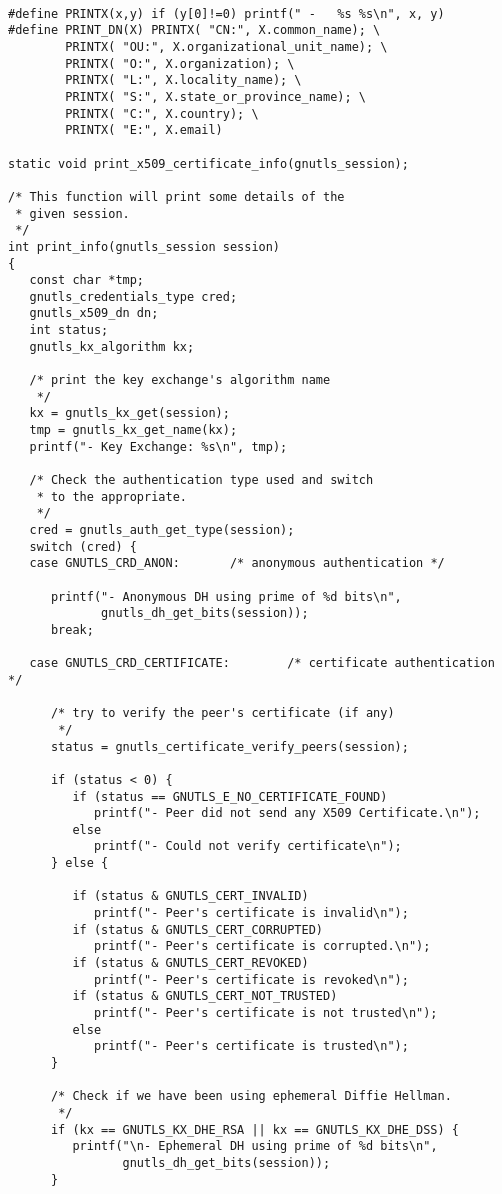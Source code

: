 \begin{verbatim}

#define PRINTX(x,y) if (y[0]!=0) printf(" -   %s %s\n", x, y)
#define PRINT_DN(X) PRINTX( "CN:", X.common_name); \
        PRINTX( "OU:", X.organizational_unit_name); \
        PRINTX( "O:", X.organization); \
        PRINTX( "L:", X.locality_name); \
        PRINTX( "S:", X.state_or_province_name); \
        PRINTX( "C:", X.country); \
        PRINTX( "E:", X.email)

static void print_x509_certificate_info(gnutls_session);

/* This function will print some details of the
 * given session.
 */
int print_info(gnutls_session session)
{
   const char *tmp;
   gnutls_credentials_type cred;
   gnutls_x509_dn dn;
   int status;
   gnutls_kx_algorithm kx;

   /* print the key exchange's algorithm name
    */
   kx = gnutls_kx_get(session);
   tmp = gnutls_kx_get_name(kx);
   printf("- Key Exchange: %s\n", tmp);

   /* Check the authentication type used and switch
    * to the appropriate.
    */
   cred = gnutls_auth_get_type(session);
   switch (cred) {
   case GNUTLS_CRD_ANON:       /* anonymous authentication */

      printf("- Anonymous DH using prime of %d bits\n",
             gnutls_dh_get_bits(session));
      break;

   case GNUTLS_CRD_CERTIFICATE:        /* certificate authentication */

      /* try to verify the peer's certificate (if any)
       */
      status = gnutls_certificate_verify_peers(session);

      if (status < 0) {
         if (status == GNUTLS_E_NO_CERTIFICATE_FOUND)
            printf("- Peer did not send any X509 Certificate.\n");
         else
            printf("- Could not verify certificate\n");
      } else {

         if (status & GNUTLS_CERT_INVALID)
            printf("- Peer's certificate is invalid\n");
         if (status & GNUTLS_CERT_CORRUPTED)
            printf("- Peer's certificate is corrupted.\n");
         if (status & GNUTLS_CERT_REVOKED)
            printf("- Peer's certificate is revoked\n");
         if (status & GNUTLS_CERT_NOT_TRUSTED)
            printf("- Peer's certificate is not trusted\n");
         else
            printf("- Peer's certificate is trusted\n");
      }

      /* Check if we have been using ephemeral Diffie Hellman.
       */
      if (kx == GNUTLS_KX_DHE_RSA || kx == GNUTLS_KX_DHE_DSS) {
         printf("\n- Ephemeral DH using prime of %d bits\n",
                gnutls_dh_get_bits(session));
      }


\end{verbatim}
